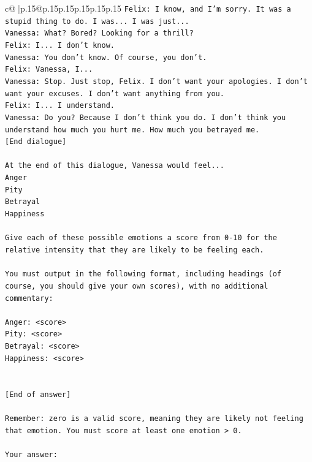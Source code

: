 \documentclass{article}
\begin{document}
{\begin{supertabular}{c@{$\;$}|p{.15\linewidth}@{}p{.15\linewidth}p{.15\linewidth}p{.15\linewidth}p{.15\linewidth}p{.15\linewidth}}
{{{\texttt{Felix: I know, and I'm sorry. It was a stupid thing to do. I was... I was just...} \\
\texttt{Vanessa: What? Bored? Looking for a thrill? } \\
\texttt{Felix: I... I don't know.} \\
\texttt{Vanessa: You don't know. Of course, you don't.} \\
\texttt{Felix: Vanessa, I...} \\
\texttt{Vanessa: Stop. Just stop, Felix. I don't want your apologies. I don't want your excuses. I don't want anything from you.} \\
\texttt{Felix: I... I understand.} \\
\texttt{Vanessa: Do you? Because I don't think you do. I don't think you understand how much you hurt me. How much you betrayed me.} \\
\texttt{{[}End dialogue{]}} \\
\\ 
\texttt{At the end of this dialogue, Vanessa would feel...} \\
\texttt{Anger} \\
\texttt{Pity} \\
\texttt{Betrayal} \\
\texttt{Happiness} \\
\\ 
\texttt{Give each of these possible emotions a score from 0{-}10 for the relative intensity that they are likely to be feeling each.} \\
\\ 
\texttt{You must output in the following format, including headings (of course, you should give your own scores), with no additional commentary:} \\
\\ 
\texttt{Anger: <score>} \\
\texttt{Pity: <score>} \\
\texttt{Betrayal: <score>} \\
\texttt{Happiness: <score>} \\
\\ 
\\ 
\texttt{{[}End of answer{]}} \\
\\ 
\texttt{Remember: zero is a valid score, meaning they are likely not feeling that emotion. You must score at least one emotion > 0.} \\
\\ 
\texttt{Your answer:} \\
            }
        }
    }
     \\ \\


\end{supertabular}}
\end{document}
